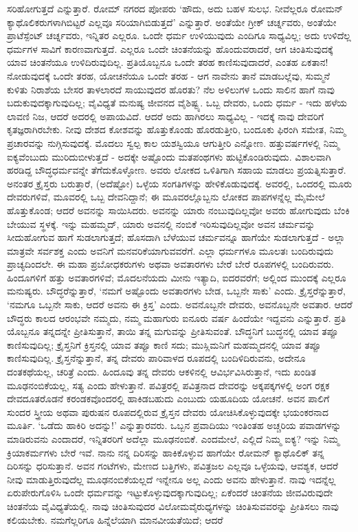 ಸರಿಹೋಗುತ್ತದೆ ಎನ್ನುತ್ತಾರೆ. ರೋಮ್​ ನಗರದ ಪೋಪರು ‘ಹೌದು, ಅದು ಬಹಳ ಸುಲಭ. ನೀವೆಲ್ಲರೂ ರೋಮನ್ ಕ್ಯಾಥೊಲಿಕರುಗಳಾಗಿಬಿಟ್ಟರೆ ಎಲ್ಲವೂ ಸರಿಯಾಗಿಬಿಡುತ್ತದೆ’ ಎನ್ನುತ್ತಾರೆ. ಅಂತೆಯೇ ಗ್ರೀಕ್ ಚರ್ಚ್ನವರು, ಅಂತೆಯೇ ಪ್ರಾಟೆಸ್ಪೆಂಟ್ ಚರ್ಚ್ನವರು, ಇನ್ನಿತರ ಎಲ್ಲರೂ. ಒಂದೇ ಧರ್ಮ ಉಳಿಯುವುದು ಎಂದಿಗೂ ಸಾಧ್ಯವಿಲ್ಲ; ಅದು ಉಳಿದೆಲ್ಲ ಧರ್ಮಗಳ ಸಾವಿಗೆ ಕಾರಣವಾಗುತ್ತದೆ. ಎಲ್ಲರೂ ಒಂದೇ ಚಿಂತನೆಯನ್ನು ಹೊಂದುವರಾದರೆ, ಆಗ ಚಿಂತಿಸುವುದಕ್ಕೆ ಯಾವ ಚಿಂತನೆಯೂ ಉಳಿದಿರುವುದಿಲ್ಲ. ಪ್ರತಿಯೊಬ್ಬನೂ ಒಂದೇ ತರಹ ಕಾಣಿಸುವುದಾದರೆ, ಎಂತಹ ಏಕತಾನ!ನೋಡುವುದಕ್ಕೆ ಒಂದೇ ತರಹ, ಯೋಚನೆಯೂ ಒಂದೇ ತರಹ - ಆಗ ನಾವೇನು ತಾನೆ ಮಾಡಬಲ್ಲೆವು, ಸುಮ್ಮನೆ ಕುಳಿತು ನಿರಾಶೆಯ ಬೇಸರ ತಾಳಲಾರದೆ ಸಾಯುವುದರ ಹೊರತು? ನೆಲ ಅಳಿಲುಗಳ ಒಂದು ಸಾಲಿನ ಹಾಗೆ ನಾವು ಬದುಕುವುದಕ್ಕಾಗುವುದಿಲ್ಲ; ವೈವಿಧ್ಯತೆ ಮನುಷ್ಯ ಜೀವನದ ವೈಶಿಷ್ಟ್ಯ. ಒಬ್ಬ ದೇವರು, ಒಂದು ಧರ್ಮ - ಇದು ಹಳೆಯ ಲಾವಣಿ ನಿಜ, ಆದರೆ ಅದರಲ್ಲಿ ಅಪಾಯವಿದೆ. ಆದರೆ ಅದು ಹಾಗಿರಲು ಸಾಧ್ಯವಿಲ್ಲ - ಇದಕ್ಕೆ ನಾವು ದೇವರಿಗೆ ಕೃತಜ್ಞರಾಗಿರಬೇಕು. ನೀವು ದೇಶದ ಕೋಶವನ್ನು ಹೊತ್ತುಕೊಂಡು ಹೊರಡುತ್ತೀರಿ, ಬಂದೂಕು ಫಿರಂಗಿ ಸಮೇತ, ನಿಮ್ಮ ಪ್ರಚಾರವನ್ನು ನುಗ್ಗಿಸುವುದಕ್ಕೆ. ಮೊದಲು ಸ್ವಲ್ಪ ಕಾಲ ಯಶಸ್ವಿಯೂ ಆಗುತ್ತೀರಿ ಎನ್ನೋಣ. ಹತ್ತುವರ್ಷಗಳಲ್ಲಿ ನಿಮ್ಮ ಐಕ್ಯವೆಂಬುದು ಮುರಿದುಬೀಳುತ್ತದೆ - ಅದಕ್ಕೇ ಅಷ್ಟೊಂದು ಮತಪಂಥಗಳು ಹುಟ್ಟಿಕೊಂಡಿರುವುದು. ವಿಶಾಲವಾಗಿ ಹರಡಿದ್ದ ಬೌದ್ಧಧರ್ಮವನ್ನೇ ತೆಗೆದುಕೊಳ್ಳೋಣ. ಅವರು ಲೋಕದ ಒಳಿತಿಗಾಗಿ ಸಹಾಯ ಮಾಡಲು ಪ್ರಯತ್ನಿಸುತ್ತಾರೆ. ಅನಂತರ ಕ್ರೈಸ್ತರು ಬರುತ್ತಾರೆ, (ಅದೆಷ್ಟೋ) ಒಳ್ಳೆಯ ಸಂಗತಿಗಳನ್ನು ಹೇಳಿಕೊಡುವುದಕ್ಕೆ. ಅವರಲ್ಲಿ, ಒಂದರಲ್ಲಿ ಮೂರು ದೇವರುಗಳಿವೆ, ಮೂವರಲ್ಲಿ ಒಬ್ಬ ದೇವನಿದ್ದಾನೆ; ಈ ಮೂವರಲ್ಲೊಬ್ಬನು ಲೋಕದ ಪಾಪಗಳನ್ನೆಲ್ಲ ಮೈಮೇಲೆ ಹೊತ್ತುಕೊಂಡ; ಆದರೆ ಅವನನ್ನು ಸಾಯಿಸಿದರು. ಅವನನ್ನು ಯಾರು ನಂಬುವುದಿಲ್ಲವೋ ಅವರು ಹೋಗುವುದು ಬೆಂಕಿ ಬೇಯುವ ಸ್ಥಳಕ್ಕೆ. ಇನ್ನು ಮಹಮ್ಮದ್, ಯಾರು ಅವನಲ್ಲಿ ನಂಬಿಕೆ ಇರಿಸುವುದಿಲ್ಲವೋ ಅವನ ಚರ್ಮವನ್ನು ಸೀದುಹೋಗುವ ಹಾಗೆ ಸುಡಲಾಗುತ್ತದೆ; ಹೊಸದಾಗಿ ಬೆಳೆಯುವ ಚರ್ಮವನ್ನೂ ಹಾಗೆಯೇ ಸುಡಲಾಗುತ್ತದೆ - ಅಲ್ಲಾ ಮಾತ್ರವೇ ಸರ್ವಶಕ್ತ ಎಂದು ಅವನಿಗೆ ಮನವರಿಕೆಯಾಗುವವರೆಗೆ. ಎಲ್ಲಾ ಧರ್ಮಗಳೂ ಮೂಲತಃ ಬಂದಿರುವುದು ಪ್ರಾಚ್ಯದಿಂದಲೇ. ಈ ಮಹಾ ಪ್ರಬೋಧಕರುಗಳು ಅಥವಾ ಅವತಾರಗಳು ಬೇರೆ ಬೇರೆ ರೂಪಗಳಲ್ಲಿ ಬಂದಿರುವರು. ಹಿಂದೂಗಳಿಗೆ ಹತ್ತು ಅವತಾರಗಳಿವೆ; ಮೊದಲನೆಯದು ಮೀನು ಇತ್ಯಾದಿ, ಐದರವರೆಗೆ; ಅಲ್ಲಿಂದ ಮುಂದಕ್ಕೆ ಎಲ್ಲರೂ ಮನುಷ್ಯರು. ಬೌದ್ಧರೆನ್ನುತ್ತಾರೆ, ‘ನಮಗೆ ಅಷ್ಟೊಂದು ಅವತಾರಗಳು ಬೇಡ, ಒಬ್ಬನೇ ಸಾಕು’ ಎಂದು. ಕ್ರೈಸ್ತರೆನ್ನುತ್ತಾರೆ, ‘ನಮಗೂ ಒಬ್ಬನೇ ಸಾಕು, ಆದರೆ ಅವನು ಈ ಕ್ರಿಸ್ತ’ ಎಂದು. ಅವನೊಬ್ಬನೇ ದೇವರು, ಅವನೊಬ್ಬನೇ ಅವತಾರ. ಆದರೆ ಬೌದ್ಧರು ಕಾಲದ ಆರಂಭವೇ ನಮ್ಮದು, ನಮ್ಮ ಮಹಾಗುರು ಐನೂರು ವರ್ಷ ಹಿಂದೆಯೇ ಇದ್ದವನು ಎನ್ನುತ್ತಾರೆ. ಪ್ರತಿ ಯೊಬ್ಬನೂ ತನ್ನದನ್ನೇ ಪ್ರೀತಿಸುತ್ತಾನೆ, ತಾಯಿ ತನ್ನ ಮಗುವನ್ನು ಪ್ರೀತಿಸುವಂತೆ. ಬೌದ್ಧನಿಗೆ ಬುದ್ಧನಲ್ಲಿ ಯಾವ ತಪ್ಪೂ ಕಾಣಿಸುವುದಿಲ್ಲ; ಕ್ರೈಸ್ತನಿಗೆ ಕ್ರಿಸ್ತನಲ್ಲಿ ಯಾವ ತಪ್ಪೂ ಕಾಣಿ ಸದು; ಮುಸ್ಲಿಮನಿಗೆ ಮಹಮ್ಮದನಲ್ಲಿ ಯಾವ ತಪ್ಪೂ ಕಾಣಿಸುವುದಿಲ್ಲ. ಕ್ರೈಸ್ತನೆನ್ನುತ್ತಾನೆ, ತನ್ನ ದೇವರು ಪಾರಿವಾಳದ ರೂಪದಲ್ಲಿ ಬಂದಿಳಿದಿರುವನು, ಅದೇನೂ ದಂತಕಥೆಯಲ್ಲ, ಚರಿತ್ರೆ ಎಂದು. ಹಿಂದೂವು ತನ್ನ ದೇವರು ಆಕಳಿನಲ್ಲಿ ಆವಿರ್ಭವಿಸಿರುತ್ತಾನೆ, ಇದು ಖಂಡಿತ ಮೂಢನಂಬಿಕೆಯಲ್ಲ, ಸತ್ಯ ಎಂದು ಹೇಳುತ್ತಾನೆ. ಪವಿತ್ರರಲ್ಲಿ ಪವಿತ್ರನಾದ ದೇವರನ್ನು ಅಕ್ಕಪಕ್ಕಗಳಲ್ಲಿ ಅಂಗ ರಕ್ಷಕ ದೇವದೂತರೊಡನೆ ಕರಂಡಕವೊಂದರಲ್ಲಿ ಹಾಕಿಡಬಹುದು ಎಂಬುದು ಯಹೂದಿಯ ಯೋಚನೆ. ಅವನ ಪಾಲಿಗೆ ಸುಂದರ ಸ್ತ್ರೀಯ ಅಥವಾ ಪುರುಷನ ರೂಪದಲ್ಲಿರುವ ಕ್ರೈಸ್ತನ ದೇವರು ಯೋಚಿಸಿಕೊಳ್ಳುವುದಕ್ಕೇ ಭಯಂಕರನಾದ ಮೂರ್ತಿ. ‘ಒಡೆದು ಹಾಕಿರಿ ಅದನ್ನು!’ ಎನ್ನುತ್ತಾರವರು. ಒಬ್ಬನ ಪ್ರವಾದಿಯು ಇಂತಿಂತಹ ಅಚ್ಚರಿಯ ಪವಾಡಗಳನ್ನು ಮಾಡಿರುವನು ಎಂದಾದರೆ, ಇನ್ನಿತರರಿಗೆ ಅದೆಲ್ಲಾ ಮೂಢನಂಬಿಕೆ. ಎಂದಮೇಲೆ, ಎಲ್ಲಿದೆ ನಿಮ್ಮ ಐಕ್ಯ? ಇನ್ನು ನಿಮ್ಮ ಕ್ರಿಯಾಕರ್ಮಗಳು ಬೇರೆ ಇವೆ. ನಾನು ನನ್ನ ದಿರಿಸನ್ನು ಹಾಕಿಕೊಳ್ಳುವ ಹಾಗೆಯೇ ರೋಮನ್ ಕ್ಯಾಥೊಲಿಕ್ ತನ್ನ ದಿರಿಸನ್ನು ಧರಿಸುತ್ತಾನೆ. ಅವನ ಗಂಟೆಗಳು, ಮೇಣದ ಬತ್ತಿಗಳು, ಪವಿತ್ರಜಲ ಎಲ್ಲವೂ ಒಳ್ಳೆಯವು, ಆವಶ್ಯಕ, ಆದರೆ ನೀವು ಮಾಡುತ್ತಿರುವುದೆಲ್ಲ ಮೂಢನಂಬಿಕೆಯಲ್ಲದೆ ಇನ್ನೇನೂ ಅಲ್ಲ ಎಂದು ಅವನು ಹೇಳುತ್ತಾನೆ. ನಾವು ಇದನ್ನೆಲ್ಲ ಏರುಪೇರುಗೊಳಿಸಿ ಒಂದೇ ಧರ್ಮವನ್ನು ಇಟ್ಟುಕೊಳ್ಳುವುದಕ್ಕಾಗುವುದಿಲ್ಲ; ಏಕೆಂದರೆ ಚಿಂತನೆಯ ಜೀವವಿರುವುದೇ ಚಿಂತನೆಯ ವೈವಿಧ್ಯತೆಯಲ್ಲಿ. ನಾವು ಚಿಂತಿಸುವುದರ ವಿಲೋಮವೈರುಧ್ಯಗಳನ್ನು ಚಿಂತಿಸುವವರನ್ನು ಪ್ರೀತಿಸಲು ನಾವು ಕಲಿಯಬೇಕು. ನಮಗೆಲ್ಲರಿಗೂ ಹಿನ್ನೆಲೆಯಾಗಿ ಮಾನವೀಯತೆಯಿದೆ; ಆದರೆ 